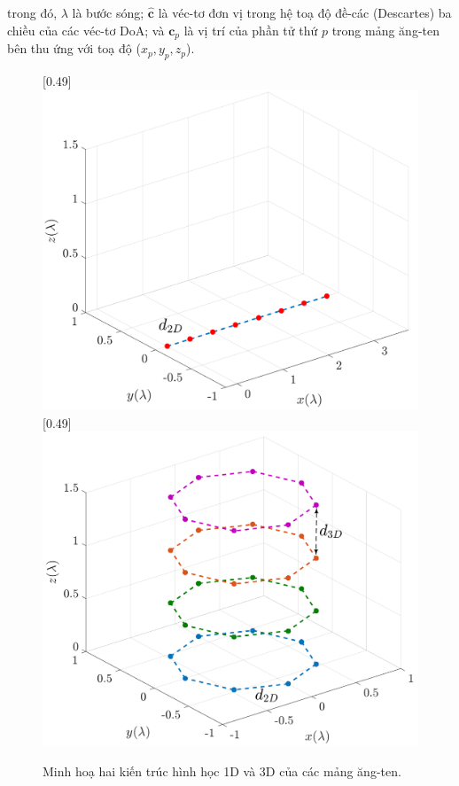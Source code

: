 trong đó, $\lambda$ là bước sóng; $\widehat{\boldsymbol{c}}$ là véc-tơ đơn vị trong hệ toạ độ đề-các (Descartes) ba chiều của các véc-tơ DoA; và $\boldsymbol{c}_p$ là vị trí của phần tử thứ $p$ trong mảng ăng-ten bên thu ứng với toạ độ ($x_p, y_p, z_p$).
\begin{figure}[ht]
    \centering
        [0.49\linewidth]
        {\includegraphics[width=\linewidth]{figures/ULA_2.pdf}}
    \hfill
        [0.49\linewidth]
        {\includegraphics[width=\linewidth]{figures/UCyA_2.pdf}}
    \caption{Minh hoạ hai kiến trúc hình học 1D và 3D của các mảng ăng-ten.}
    \label{fig:antenstruct}
\end{figure}


